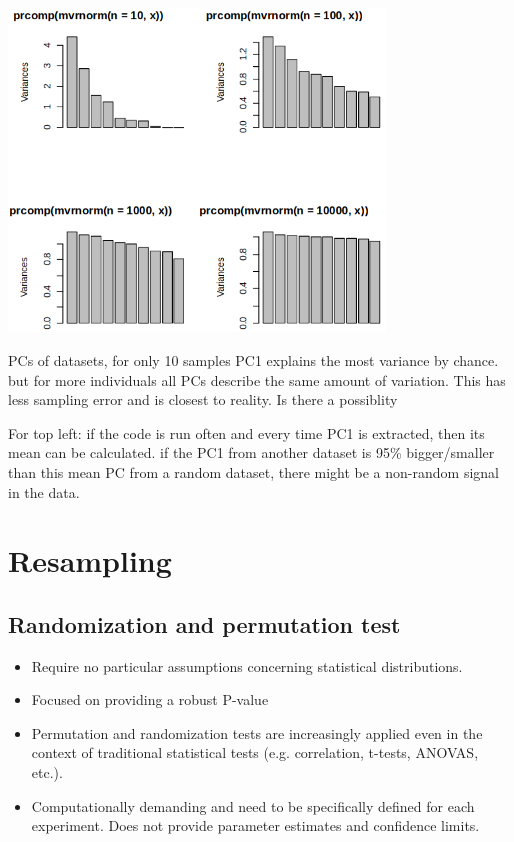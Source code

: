 \documentclass{article}
\begin{document}
\begin{center}
    \includegraphics[width = 0.75\textwidth]{bayesian/pca_res.png}
\end{center}
PCs of datasets, for only 10 samples PC1 explains the most variance by chance. but for more individuals all PCs describe the same amount of variation. This has less sampling error and is closest to reality. Is there a possiblity

For top left: if the code is run often and every time PC1 is extracted, then its mean can be calculated. if the PC1 from another dataset is 95\% bigger/smaller than this mean PC from a random dataset, there might be a non-random signal in the data.

\section{Resampling}

\subsection{Randomization and permutation test}

\begin{itemize}
    \item Require no particular assumptions concerning statistical distributions. 
    \item Focused on providing a robust P-value
    \item Permutation  and randomization tests are increasingly applied even in the context of traditional statistical tests (e.g. correlation, t-tests, ANOVAS, etc.).
    \item Computationally demanding and need to be specifically defined for each experiment. Does not provide parameter estimates and confidence limits.
\end{itemize}
\end{document}
